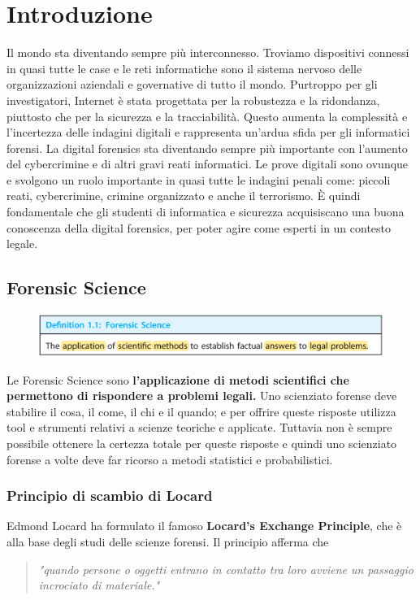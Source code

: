 \chapter{Introduzione}
Il mondo sta diventando sempre più interconnesso. Troviamo dispositivi connessi in quasi tutte le case e le reti informatiche sono il sistema nervoso delle organizzazioni aziendali e governative di tutto il mondo. Purtroppo per gli investigatori, Internet è stata progettata per la robustezza e la ridondanza, piuttosto che per la sicurezza e la tracciabilità. Questo aumenta la complessità e l'incertezza delle indagini digitali e rappresenta un'ardua sfida per gli informatici forensi. La digital forensics sta diventando sempre più importante con l'aumento del cybercrimine e di altri gravi reati informatici. Le prove digitali sono ovunque e svolgono un ruolo importante in quasi tutte le indagini penali come: piccoli reati, cybercrimine, crimine organizzato e anche il terrorismo. È quindi fondamentale che gli studenti di informatica e sicurezza acquisiscano una buona conoscenza della digital forensics, per poter agire come esperti in un contesto legale.

\section{Forensic Science}
\begin{figure}[h]
    \includegraphics[width=\textwidth]{Capitolo 1/Figure/forensic-science-def.png}
\end{figure}

Le Forensic Science sono \textbf{l'applicazione di metodi scientifici che permettono di rispondere a problemi legali.}
Uno scienziato forense deve stabilire il cosa, il come, il chi e il quando; e per offrire queste risposte utilizza tool e strumenti relativi a scienze teoriche e applicate. Tuttavia non è sempre possibile ottenere la certezza totale per queste risposte e quindi uno scienziato forense a volte deve far ricorso a metodi statistici e probabilistici.

\subsection{Principio di scambio di Locard}
Edmond Locard ha formulato il famoso \textbf{Locard’s Exchange Principle}, che è alla base degli studi delle scienze forensi. Il principio afferma che 
\begin{quote}
    \textit{"quando persone o oggetti entrano in contatto tra loro avviene un passaggio incrociato di materiale."}
\end{quote}

